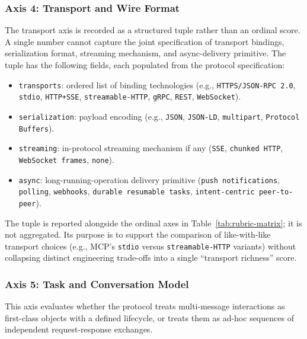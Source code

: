 \subsubsection{Axis 4: Transport and Wire Format}
\label{sec:rubric:axis4}

The transport axis is recorded as a structured tuple rather
than an ordinal score. A single number cannot capture the
joint specification of transport bindings, serialization
format, streaming mechanism, and async-delivery primitive.
The tuple has the following fields, each populated from the
protocol specification:

\begin{itemize}
  \item \texttt{transports}: ordered list of binding
    technologies (e.g., \texttt{HTTPS/JSON-RPC 2.0},
    \texttt{stdio}, \texttt{HTTP+SSE}, \texttt{streamable-HTTP},
    \texttt{gRPC}, \texttt{REST}, \texttt{WebSocket}).
  \item \texttt{serialization}: payload encoding
    (e.g., \texttt{JSON}, \texttt{JSON-LD}, \texttt{multipart},
    \texttt{Protocol Buffers}).
  \item \texttt{streaming}: in-protocol streaming mechanism
    if any (\texttt{SSE}, \texttt{chunked HTTP},
    \texttt{WebSocket frames}, \texttt{none}).
  \item \texttt{async}: long-running-operation delivery
    primitive (\texttt{push notifications},
    \texttt{polling}, \texttt{webhooks},
    \texttt{durable resumable tasks}, \texttt{intent-centric
    peer-to-peer}).
\end{itemize}

The tuple is reported alongside the ordinal axes in
Table~\ref{tab:rubric-matrix}; it is not aggregated. Its
purpose is to support the comparison of like-with-like
transport choices (e.g., MCP's \texttt{stdio} versus
\texttt{streamable-HTTP} variants) without collapsing
distinct engineering trade-offs into a single
``transport richness'' score.

\subsubsection{Axis 5: Task and Conversation Model}
\label{sec:rubric:axis5}

This axis evaluates whether the protocol treats
multi-message interactions as first-class objects with a
defined lifecycle, or treats them as ad-hoc sequences of
independent request-response exchanges.

